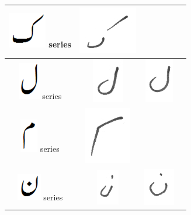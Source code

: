 \begin{table}[h]
\begin{tabular}{@{}cccc@{}}
\hline
\includegraphics[scale=0.15]{kaaf_orig} series & \includegraphics[scale=0.15]{172} & & \\
\hline
\includegraphics[scale=0.15]{Laam_orig} series & \includegraphics[scale=0.15]{173} & \includegraphics[scale=0.15]{174} &  \\
\hline
\includegraphics[scale=0.15]{meem_orig} series & \includegraphics[scale=0.15]{175} & &  \\
\hline
\includegraphics[scale=0.15]{noon_orig} series & \includegraphics[scale=0.15]{176} & \includegraphics[scale=0.15]{177} &  \\

\end{tabular}
\end{table}
